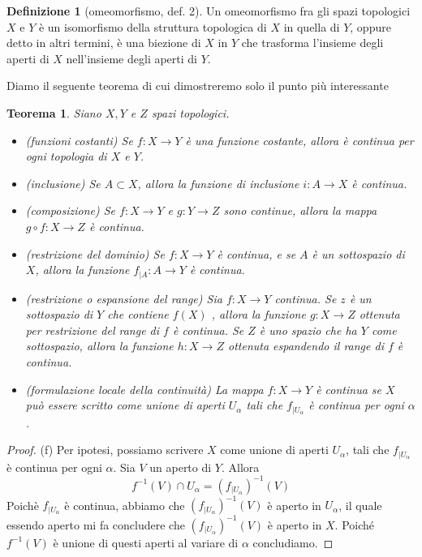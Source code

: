 \documentclass[10pt,a4paper]{article}
\theoremstyle{definition}
\newtheorem{defi}{Definizione}
\theoremstyle{plain}
\newtheorem{teo}{Teorema}
\theoremstyle{remark}
\theoremstyle{remark}
\begin{document}
\begin{defi}[omeomorfismo, def. 2] Un omeomorfismo fra gli spazi topologici $X$ e $Y$ è un isomorfismo della struttura topologica di $X$ in quella di $Y$, oppure detto in altri termini, è una biezione di $X$ in $Y$ che trasforma l'insieme degli aperti di $X$ nell'insieme degli aperti di $Y$.
\end{defi}

Diamo il seguente teorema di cui dimostreremo solo il punto più interessante


\begin{teo} Siano $X,Y$ e $Z$ spazi topologici.
\begin{itemize}
\item[(a) ] (funzioni costanti) Se $f : X \to Y$ è una funzione costante, allora è continua per ogni topologia di $X$ e $Y$.
\item[(b) ] (inclusione) Se $A \subset X$, allora la funzione di inclusione $i : A \to X$ è continua. 
\item[(c) ] (composizione) Se $f: X \to Y$ e $g: Y \to Z$ sono continue, allora la mappa $g \circ f : X \to Z$ è continua.
\item[(d) ] (restrizione del dominio) Se $f: X \to Y$ è continua, e se $A$ è un sottospazio di $X$, allora la funzione $f_{|A} : A \to Y$ è continua.
\item[(e) ] (restrizione o espansione del range) Sia $f: X \to Y$ continua. Se $z$ è un sottospazio di $Y$ che contiene $f(X)$ , allora la funzione $g: X \to Z$ ottenuta per restrizione del range di $f$ è continua. Se $Z$ è uno spazio che ha $Y$ come sottospazio, allora la funzione $h : X \to Z$ ottenuta espandendo il range di $f$ è continua.
\item[(f) ] (formulazione locale della continuità) La mappa $f: X \to Y$ è continua se $X$ può essere scritto come unione di aperti $U_{\alpha}$ tali che $f_{|U_{\alpha}}$ è continua per ogni $\alpha$.

\end{itemize}

\end{teo}
\begin{proof} 
(f) Per ipotesi, possiamo scrivere $X$ come unione di aperti $U_{\alpha}$, tali che $f_{|U_{\alpha}}$ è continua per ogni $\alpha$. Sia $V$ un aperto di $Y$. Allora \[ f^{-1}(V) \cap U_{\alpha} = \left(f_{|U_{\alpha}}\right)^{-1}(V) \] Poichè $f_{|U_{\alpha}}$ è continua, abbiamo che $\left(f_{|U_{\alpha}}\right)^{-1}(V)$ è aperto in $U_{\alpha}$, il quale essendo aperto mi fa concludere che $\left(f_{|U_{\alpha}}\right)^{-1}(V)$ è aperto in $X$. Poiché $f^{-1}(V)$ è unione di questi aperti al variare di $\alpha$ concludiamo. 

\end{proof}
\end{document}
